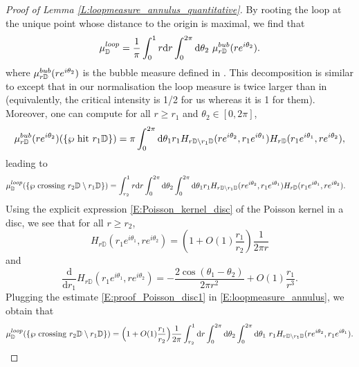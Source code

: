 \documentclass[11pt]{article}
\theoremstyle{remark}
\newcommand{\D}{\mathbb{D}}
\renewcommand{\d}{\mathrm{d}}
\def \loopmeasure{\mu^{\rm loop}}
\def \bubmeasure{\mu^{\rm bub}}
\numberwithin{equation}{section}
\begin{document}
\begin{proof}[Proof of Lemma \ref{L:loopmeasure_annulus_quantitative}]
By rooting the loop at the unique point whose distance to the origin is maximal, we find that
\begin{equation}
\label{E:decomposition_loopmeasure}
\loopmeasure_\D = \frac{1}{\pi} \int_0^1 r \d r \int_0^{2\pi} \d \theta_2 ~\bubmeasure_{r \D} (r e^{i\theta_2}).
\end{equation}
where $\bubmeasure_{r\D}(r e^{i\theta_2})$ is the bubble measure defined in \cite{Lawler04}. This decomposition is similar to \cite[Proposition 8]{Lawler04} except that in our normalisation the loop measure is twice larger than in \cite{Lawler04} (equivalently, the critical intensity is 1/2 for us whereas it is 1 for them). Moreover, one can compute for all $r \geq r_1$ and $\theta_2 \in [0,2\pi]$,
\[
\bubmeasure_{r \D}(r e^{i \theta_2})( \{ \wp \text{~hit~} r_1 \D \} ) = \pi \int_0^{2\pi} \d \theta_1 r_1 H_{r \D \setminus r_1 \D}(r e^{i\theta_2}, r_1 e^{i \theta_1}) H_{r \D}(r_1 e^{i\theta_1}, r e^{i\theta_2}),
\]
leading to
\begin{align}
\label{E:loopmeasure_annulus}
& \loopmeasure_\D ( \{ \wp \mathrm{~crossing~} r_2 \D \setminus r_1 \D \} ) 
= \int_{r_2}^1 r \d r \int_0^{2\pi} \d \theta_2
\int_0^{2\pi} \d \theta_1 r_1 H_{r \D \setminus r_1 \D}(r e^{i\theta_2}, r_1 e^{i \theta_1}) H_{r \D}(r_1 e^{i\theta_1}, r e^{i\theta_2}).
\end{align}
Using the explicit expression \eqref{E:Poisson_kernel_disc} of the Poisson kernel in a disc, we see that for all $r \geq r_2$,
\begin{equation}
\label{E:proof_Poisson_disc1}
H_{r \D}(r_1 e^{i\theta_1},r e^{i\theta_2})
= \left( 1 + O(1) \frac{r_1}{r_2} \right) \frac{1}{2\pi r}
\end{equation}
and 
\begin{equation}
\label{E:proof_Poisson_disc2}
\frac{\d}{\d r_1} H_{r \D}(r_1 e^{i\theta_1},r e^{i\theta_2}) = - \frac{2 \cos(\theta_1 - \theta_2)}{2\pi r^2} + O(1) \frac{r_1}{r^3}.
\end{equation}
Plugging the estimate \eqref{E:proof_Poisson_disc1} in \eqref{E:loopmeasure_annulus}, we obtain that
\begin{align*}
\loopmeasure_\D ( \{ \wp \mathrm{~crossing~} r_2 \D \setminus r_1 \D \} )
= \Big( 1 + O(1)\frac{r_1}{r_2} \Big) \frac{1}{2\pi} \int_{r_2}^1 \d r \int_0^{2\pi}  \d \theta_2 \int_0^{2\pi} \d \theta_1 ~r_1 H_{r \D \setminus r_1 \D}(re^{i\theta_2},r_1 e^{i\theta_1}).
\end{align*}

\end{proof}
\end{document}
